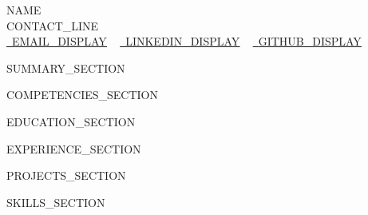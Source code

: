 \documentclass[letterpaper,11pt]{article}
\begin{document}
    \begin{center}
        {\Huge\scshape {{NAME}}}
        \\ {{CONTACT_LINE}}\\
        \small
        \href{mailto:{{EMAIL_URL}}}{\raisebox{-0.2\height}\faEnvelope\ \underline{{{{EMAIL_DISPLAY}}}}} ~
        \href{{{{LINKEDIN_URL}}}}{\raisebox{-0.2\height}\faLinkedin\ \underline{{{{LINKEDIN_DISPLAY}}}}} ~
        \href{{{{GITHUB_URL}}}}{\raisebox{-0.2\height}\faGlobe\ \underline{{{{GITHUB_DISPLAY}}}}}
    \end{center}

{{SUMMARY_SECTION}}

{{COMPETENCIES_SECTION}}

{{EDUCATION_SECTION}}

{{EXPERIENCE_SECTION}}

{{PROJECTS_SECTION}}

{{SKILLS_SECTION}}
\end{document}

